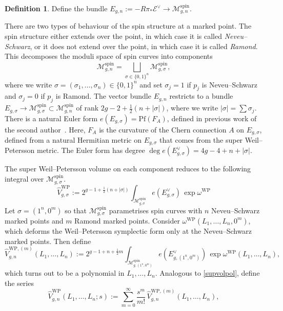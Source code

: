 \documentclass[a4paper]{article}
\theoremstyle{plain}
\theoremstyle{definition}
\newtheorem{definition}[theorem]{Definition}
\newcommand{\modm}{\mathcal{M}}
\newcommand{\ce}{\mathcal{E}}
\begin{document}
\begin{definition} \label{obsbun}
Define the bundle $E_{g,n}:=-R\pi_*\ce^\vee \to \modm_{g,n}^{\text{spin}}$. 
\end{definition}


There are two types of behaviour of the spin structure at a marked point. The spin structure either extends over the point, in which case it is called {\em Neveu--Schwarz}, or it does not extend over the point, in which case it is called {\em Ramond}. This decomposes the moduli space of spin curves into components
\[
\modm_{g,n}^{\text{spin}}=\bigsqcup_{\sigma\in\{0,1\}^n}\modm_{g,\sigma}^{\text{spin}},
\]
where we write $\sigma=(\sigma_1, \ldots, \sigma_n)\in\{0,1\}^n$ and set $\sigma_j=1$ if $p_j$ is Neveu--Schwarz and $\sigma_j=0$ if $p_j$ is Ramond. The vector bundle $E_{g,n}$ restricts to a bundle $E_{g,\sigma}\to\modm^{\text{spin}}_{g,\sigma}\subset\modm_{g,n}^{\text{spin}}$ of rank $2g-2+\frac{1}{2}(n+|\sigma|)$, where we write $|\sigma|=\sum\sigma_j$. There is a natural Euler form $e(E_{g,\sigma})=\text{Pf}(F_A)$, defined in previous work of the second author~\cite{NorSup}. Here, $F_A$ is the curvature of the Chern connection $A$ on $E_{g,\sigma}$, defined from a natural Hermitian metric on $E_{g,\sigma}$ that comes from the super Weil--Petersson metric. The Euler form has degree $\deg e(E_{g,\sigma}^\vee)=4g-4+n+|\sigma|$. 





The super Weil--Petersson volume on each component reduces to the following integral over $\modm_{g,\sigma}^{\text{spin}}$.
\begin{equation}
\widehat{V}^{\mathrm{WP}}_{g,\sigma} := 2^{g-1+\frac{1}{2}(n+|\sigma|)} \int_{\modm_{g,\sigma}^{\text{spin}}} e(E_{g,\sigma}^\vee) \, \exp\omega^{\mathrm{WP}}
\end{equation}
Let $\sigma=(1^n,0^m)$ so that $\modm_{g,\sigma}^{\text{spin}}$ parametrises spin curves with $n$ Neveu--Schwarz marked points and $m$ Ramond marked points. Consider $\omega^{\mathrm{WP}}(L_1, \ldots, L_n,0^m)$, which deforms the Weil--Petersson symplectic form only at the Neveu--Schwarz marked points. Then define
\begin{equation} \label{supvol}
\widehat{V}^{\mathrm{WP},(m)}_{g,n}(L_1, \ldots, L_n) := 2^{g-1+n+\frac{1}{2}m} \int_{{\modm}_{g,(1^n,0^m)}^{\text{spin}}}\!\! e(E_{g,(1^n,0^m)}^\vee) \, \exp\omega^{\mathrm{WP}}(L_1, \ldots, L_n),
\end{equation}
which turns out to be a polynomial in $L_1, \ldots, L_n$. Analogous to \cref{supvolpol}, define the series
\[
\widehat{V}^{\mathrm{WP}}_{g,n}(L_1, \ldots, L_n;s) := \sum_{m=0}^\infty \frac{s^m}{m!} \, \widehat{V}^{\mathrm{WP},(m)}_{g,n}(L_1, \ldots, L_n),
\]
\end{document}
